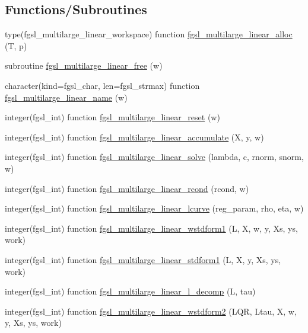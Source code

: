 \subsection*{Functions/\+Subroutines}
\begin{DoxyCompactItemize}
\item 
type(fgsl\+\_\+multilarge\+\_\+linear\+\_\+workspace) function \hyperlink{multilarge_8finc_a8ddf19b48933383805c0758c7348a49d}{fgsl\+\_\+multilarge\+\_\+linear\+\_\+alloc} (T, p)
\item 
subroutine \hyperlink{multilarge_8finc_a5a87bef286ed91ddcd3f8179152693fa}{fgsl\+\_\+multilarge\+\_\+linear\+\_\+free} (w)
\item 
character(kind=fgsl\+\_\+char, len=fgsl\+\_\+strmax) function \hyperlink{multilarge_8finc_a5deb84055ba5449fdf4aa950e0c975a8}{fgsl\+\_\+multilarge\+\_\+linear\+\_\+name} (w)
\item 
integer(fgsl\+\_\+int) function \hyperlink{multilarge_8finc_a591c80c16183c4cd85fddcfbc7dfa042}{fgsl\+\_\+multilarge\+\_\+linear\+\_\+reset} (w)
\item 
integer(fgsl\+\_\+int) function \hyperlink{multilarge_8finc_a5d536b7868cefe9b2c7a38986adb79a8}{fgsl\+\_\+multilarge\+\_\+linear\+\_\+accumulate} (X, y, w)
\item 
integer(fgsl\+\_\+int) function \hyperlink{multilarge_8finc_a247264b93af58a97ca5139d1a8de0926}{fgsl\+\_\+multilarge\+\_\+linear\+\_\+solve} (lambda, c, rnorm, snorm, w)
\item 
integer(fgsl\+\_\+int) function \hyperlink{multilarge_8finc_a418e63ac467265f3f37c798163ced789}{fgsl\+\_\+multilarge\+\_\+linear\+\_\+rcond} (rcond, w)
\item 
integer(fgsl\+\_\+int) function \hyperlink{multilarge_8finc_a952d6a8a156f5c348b4c0bd7ab58ee1d}{fgsl\+\_\+multilarge\+\_\+linear\+\_\+lcurve} (reg\+\_\+param, rho, eta, w)
\item 
integer(fgsl\+\_\+int) function \hyperlink{multilarge_8finc_a0d7f03295eaab8bdf7fe1059554bc153}{fgsl\+\_\+multilarge\+\_\+linear\+\_\+wstdform1} (L, X, w, y, Xs, ys, work)
\item 
integer(fgsl\+\_\+int) function \hyperlink{multilarge_8finc_a48001360ad92c99eccdc8a412423262d}{fgsl\+\_\+multilarge\+\_\+linear\+\_\+stdform1} (L, X, y, Xs, ys, work)
\item 
integer(fgsl\+\_\+int) function \hyperlink{multilarge_8finc_af96d41800da8aea6be5f49fbe41efe65}{fgsl\+\_\+multilarge\+\_\+linear\+\_\+l\+\_\+decomp} (L, tau)
\item 
integer(fgsl\+\_\+int) function \hyperlink{multilarge_8finc_a06f46b61b5e6c67264692f688eafc4f4}{fgsl\+\_\+multilarge\+\_\+linear\+\_\+wstdform2} (L\+Q\+R, Ltau, X, w, y, Xs, ys, work)

\end{DoxyCompactItemize}

